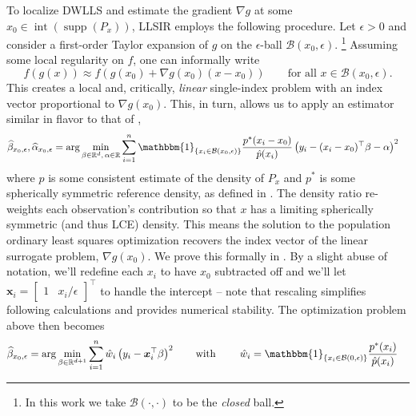 \documentclass[11pt]{article}
\begin{document}
To localize DWLLS and estimate the gradient $\nabla g$ at some $x_0 \in \operatorname{int}(\operatorname{supp}(P_x))$, LLSIR employs the following procedure. Let $\epsilon > 0$ and consider a first-order Taylor expansion of $g$ on the $\epsilon$-ball $\mathcal{B}(x_0,\epsilon)$. \footnote{In this work we take $\mathcal{B}(\cdot, \cdot )$ to be the \textit{closed} ball.} Assuming some local regularity on $f$, one can informally write
\begin{equation} \label{eq: surrogate decomposition curve}
    f(g(x)) \approx f(g(x_0) + \nabla g(x_0)(x - x_0)) \qquad \text{for all }x \in \mathcal{B}(x_0, \epsilon).
\end{equation}
This creates a local and, critically, \textit{linear}  single-index problem with an index vector proportional to $\nabla g(x_0)$. This, in turn, allows us to apply an estimator similar in flavor to that of \citet{Newey_Ruud_2005},
\begin{align} 
\widehat{\beta}_{x_0,\epsilon}, \widehat{\alpha}_{x_0, \epsilon} &= \arg\min_{\beta \in \mathbb{R}^d,\, \alpha \in \mathbb{R}} \sum_{i = 1}^{n}\mathbbm{1}_{\{x_i \in \mathcal{B}(x_0, \epsilon)\}}\frac{p^*(x_i - x_0)}{\hat{p}(x_i)}\left(y_i - (x_i - x_0)^{\top}\beta - \alpha\right)^2 
\end{align}
where $\hat{p}$ is some consistent estimate of the density of $P_x$ and $p^*$ is some spherically symmetric reference density, as defined in . The density ratio re-weights each observation's contribution so that $x$ has a limiting spherically symmetric (and thus LCE) density. This means the solution to the population ordinary least squares optimization recovers the index vector of the linear surrogate problem, $\nabla g(x_0)$. We prove this formally in . By a slight abuse of notation, we'll redefine each $x_i$ to have $x_0$ subtracted off and we'll let $\boldsymbol{x}_i = \begin{bmatrix}
    1 & x_i/\epsilon
\end{bmatrix}^{\top}$ to handle the intercept -- note that rescaling simplifies following calculations and provides numerical stability. The optimization problem above then becomes 
\begin{align} 
\widehat{\beta}_{x_0,\epsilon} &= \arg\min_{\beta \in \mathbb{R}^{d+1}} \sum_{i = 1}^{n}\hat{w}_i\left(y_i - \boldsymbol{x}_i^{\top}\beta\right)^2 \qquad \text{with }\qquad \hat{w}_i = \mathbbm{1}_{\{x_i \in \mathcal{B}(0, \epsilon)\}}\frac{p^*(x_i)}{\hat{p}(x_i)}
\end{align}
\end{document}
